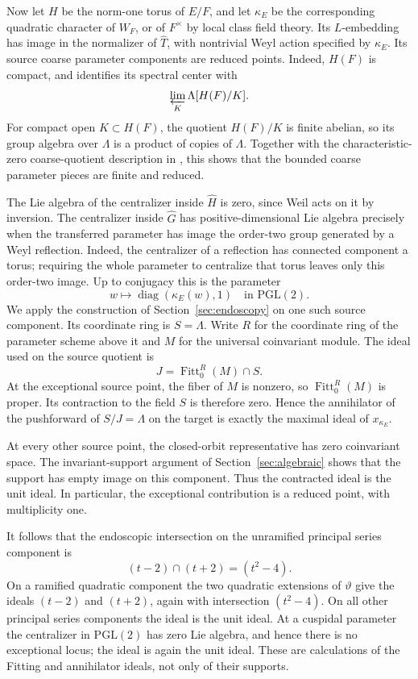 \documentclass[11pt,a4paper]{amsart}
\DeclareMathOperator{\Fitt}{Fitt}
\theoremstyle{definition}
\theoremstyle{remark}
\begin{document}
Now let $H$ be the norm-one torus of $E/F$, and let
$\kappa_E$ be the corresponding quadratic character of $W_F$,
or of $F^\times$ by local class field theory. Its $L$-embedding
has image in the normalizer of $\widehat T$, with nontrivial
Weyl action specified by $\kappa_E$. Its source coarse parameter
components are reduced points. Indeed, $H(F)$ is compact, and
\cite[Proposition IX.6.4]{FS} identifies its spectral center with
$$
 \varprojlim_K\Lambda[H(F)/K].
$$
For compact open $K\subset H(F)$, the quotient $H(F)/K$ is finite
abelian, so its group algebra over $\Lambda$ is a product of
copies of $\Lambda$. Together with the characteristic-zero
coarse-quotient description in \cite[Theorem 1.7]{DHKM}, this
shows that the bounded coarse parameter pieces are finite and
reduced.

The Lie algebra of the centralizer
inside $\widehat H$ is zero, since Weil acts on it by inversion.
The centralizer inside $\widehat G$ has positive-dimensional Lie
algebra precisely when the transferred parameter has image the
order-two group generated by a Weyl reflection. Indeed, the
centralizer of a reflection has connected component a torus;
requiring the whole parameter to centralize that torus leaves
only this order-two image. Up to conjugacy this is the parameter
$$
 w\longmapsto\operatorname{diag}(\kappa_E(w),1)
                       \quad\text{in }\mathrm{PGL}(2).
$$
We apply the construction of Section~\ref{sec:endoscopy} on one
such source component. Its coordinate ring is $S=\Lambda$.
Write $R$ for the coordinate ring of the parameter scheme above
it and $M$ for the universal coinvariant module. The ideal used
on the source quotient is
$$
 J=\Fitt_0^R(M)\cap S.
$$
At the exceptional source point, the fiber of $M$ is nonzero,
so $\Fitt_0^R(M)$ is proper. Its contraction to the field $S$
is therefore zero. Hence the annihilator of the pushforward of
$S/J=\Lambda$ on the target is exactly the maximal ideal of
$x_{\kappa_E}$.

At every other source point, the closed-orbit representative has
zero coinvariant space. The invariant-support argument of
Section~\ref{sec:algebraic} shows that the support has empty
image on this component. Thus the contracted ideal is the unit
ideal. In particular, the exceptional contribution is a reduced
point, with multiplicity one.

It follows that the endoscopic intersection on the unramified
principal series component is
$$
 (t-2)\cap(t+2)=(t^2-4).
$$
On a ramified quadratic component the two quadratic extensions of
$\vartheta$ give the ideals $(t-2)$ and $(t+2)$, again with
intersection $(t^2-4)$. On all other principal series components
the ideal is the unit ideal. At a cuspidal parameter the
centralizer in $\mathrm{PGL}(2)$ has zero Lie algebra, and hence
there is no exceptional locus; the ideal is again the unit ideal.
These are calculations of the Fitting and annihilator ideals, not
only of their supports.
\end{document}
